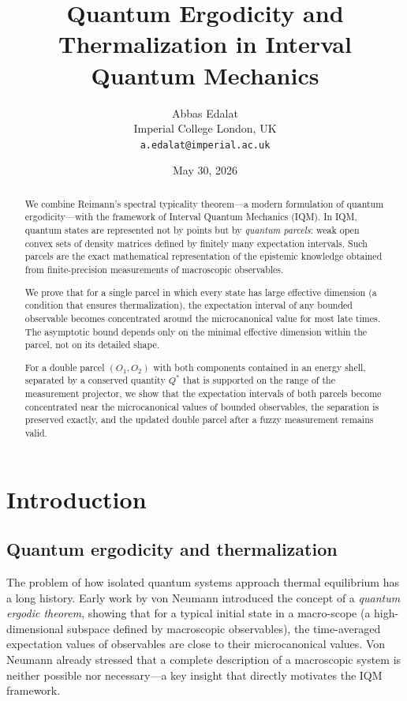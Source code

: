 \documentclass[11pt, onecolumn]{article}
\title{Quantum Ergodicity and Thermalization in Interval Quantum Mechanics}
\author{Abbas Edalat\\ Imperial College London, UK\\ \texttt{a.edalat@imperial.ac.uk}}
\date{May 30, 2026}
\begin{document}
\maketitle

\begin{abstract}
We combine Reimann's spectral typicality theorem---a modern formulation of quantum ergodicity---with the framework of Interval Quantum Mechanics (IQM). In IQM, quantum states are represented not by points but by \emph{quantum parcels}: weak open convex sets of density matrices defined by finitely many expectation intervals. Such parcels are the exact mathematical representation of the epistemic knowledge obtained from finite-precision measurements of macroscopic observables.

We prove that for a single parcel in which every state has large effective dimension (a condition that ensures thermalization), the expectation interval of any bounded observable becomes concentrated around the microcanonical value for most late times. The asymptotic bound depends only on the minimal effective dimension within the parcel, not on its detailed shape.

For a double parcel \((O_1,O_2)\) with both components contained in an energy shell, separated by a conserved quantity \(Q^*\) that is supported on the range of the measurement projector, we show that the expectation intervals of both parcels become concentrated near the microcanonical values of bounded observables, the separation is preserved exactly, and the updated double parcel after a fuzzy measurement remains valid.
\end{abstract}

\section{Introduction}

\subsection{Quantum ergodicity and thermalization}

The problem of how isolated quantum systems approach thermal equilibrium has a long history. Early work by von Neumann \cite{vonNeumann1955} introduced the concept of a \emph{quantum ergodic theorem}, showing that for a typical initial state in a macro-scope (a high-dimensional subspace defined by macroscopic observables), the time-averaged expectation values of observables are close to their microcanonical values. Von Neumann already stressed that a complete description of a macroscopic system is neither possible nor necessary---a key insight that directly motivates the IQM framework.
\end{document}
